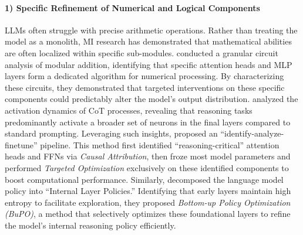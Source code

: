 \documentclass[11pt,letterpaper]{mystyle}
\begin{document}
  \paragraph{1) Specific Refinement of Numerical and Logical Components}
  LLMs often struggle with precise arithmetic operations. Rather than treating the model as a monolith, MI research has demonstrated that mathematical abilities are often localized within specific sub-modules.
  \citet{quirke2024understanding} conducted a granular circuit analysis of modular addition, identifying that specific attention heads and MLP layers form a dedicated algorithm for numerical processing. By characterizing these circuits, they demonstrated that targeted interventions on these specific components could predictably alter the model's output distribution.
  \citet{yang2024chainofthoughtlargelanguagemodels} analyzed the activation dynamics of CoT processes, revealing that reasoning tasks predominantly activate a broader set of neurons in the final layers compared to standard prompting.
  Leveraging such insights,
  \citet{zhang2024interpreting} proposed an ``identify-analyze-finetune'' pipeline. This method first identified ``reasoning-critical'' attention heads and FFNs via \textit{Causal Attribution}, then froze most model parameters and performed \textit{Targeted Optimization} exclusively on these identified components to boost computational performance.
  Similarly, \citet{tanvocab_2025arxiv} decomposed the language model policy into ``Internal Layer Policies.'' Identifying that early layers maintain high entropy to facilitate exploration, they proposed \textit{Bottom-up Policy Optimization (BuPO)}, a method that selectively optimizes these foundational layers to refine the model's internal reasoning policy efficiently.
  
\end{document}
